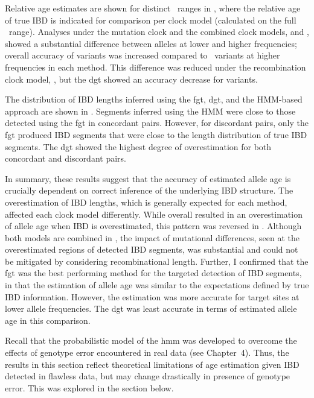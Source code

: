 %

%

Relative age estimates are shown for distinct \fk{}~ranges in , where the relative age of true IBD is indicated for comparison per clock model (calculated on the full \fk{}~range).
Analyses under the mutation clock and the combined clock models, \ClockM and \ClockC, showed a substantial difference between alleles at lower and higher frequencies; \eg overall accuracy of \fk{[2,5]} variants was increased compared to \fk{}~variants at higher frequencies in each method.
This difference was reduced under the recombination clock model, \ClockR, but the \gls{dgt} showed an accuracy decrease for \fk{[2,5]} variants.


%

%

The distribution of IBD lengths inferred using the \gls{fgt}, \gls{dgt}, and the HMM-based approach are shown in .
Segments inferred using the HMM were close to those detected using the \gls{fgt} in concordant pairs.
However, for discordant pairs, only the \gls{fgt} produced IBD segments that were close to the length distribution of true IBD segments.
The \gls{dgt} showed the highest degree of overestimation for both concordant and discordant pairs.

In summary, these results suggest that the accuracy of estimated allele age is crucially dependent on correct inference of the underlying IBD structure.
The overestimation of IBD lengths, which is generally expected for each method, affected each clock model differently.
While \ClockM overall resulted in an overestimation of allele age when IBD is overestimated, this pattern was reversed in \ClockR.
Although both models are combined in \ClockC, the impact of mutational differences, seen at the overestimated regions of detected IBD segments, was substantial and could not be mitigated by considering recombinational length.
Further, I confirmed that the \gls{fgt} was the best performing method for the targeted detection of IBD segments, in that the estimation of allele age was similar to the expectations defined by true IBD information.
However, the estimation was more accurate for target sites at lower allele frequencies.
The \gls{dgt} was least accurate in terms of estimated allele age in this comparison.

Recall that the probabilistic model of the \gls{hmm} was developed to overcome the effects of genotype error encountered in real data (see Chapter~4).
Thus, the results in this section reflect theoretical limitations of age estimation given IBD detected in flawless data, but may change drastically in presence of genotype error.
This was explored in the section below.



